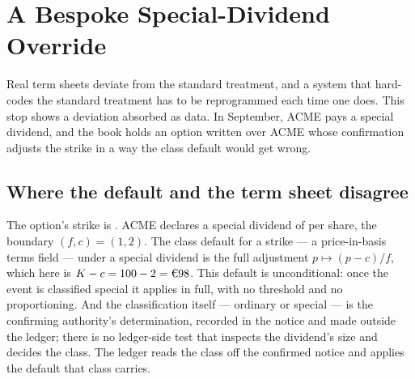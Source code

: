 \section{A Bespoke Special-Dividend Override}\label{sec:tour-special-div}

Real term sheets deviate from the standard treatment, and a system that hard-codes the
standard treatment has to be reprogrammed each time one does. This stop shows a
deviation absorbed as data. In September, ACME pays a special dividend, and the book
holds an option written over ACME whose confirmation adjusts the strike in a way the
class default would get wrong.

\subsection{Where the default and the term sheet disagree}

The option's strike is . ACME declares a special dividend of  per
share, the boundary $(f, c) = (1, 2)$. The class default for a strike --- a
price-in-basis terms field --- under a special dividend is the full adjustment
$p \mapsto (p - c)/f$, which here is $K - c = 100 - 2 = \EUR{98}$. This default is
unconditional: once the event is classified special it applies in full, with no
threshold and no proportioning. And the classification itself --- ordinary or special
--- is the confirming authority's determination, recorded in the notice and made
outside the ledger; there is no ledger-side test that inspects the dividend's size and
decides the class. The ledger reads the class off the confirmed notice and applies the
default that class carries.


